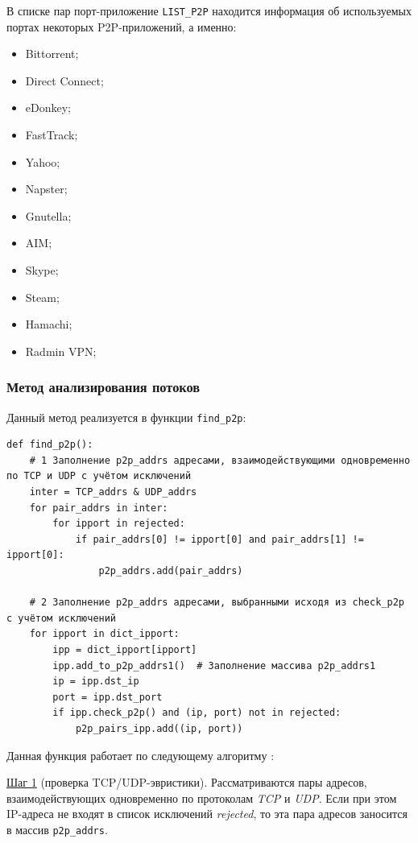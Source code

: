 \documentclass[bachelor, och, coursework]{SCWorks}
\begin{document}
В списке пар порт-приложение \texttt{LIST_P2P} находится информация об используемых портах некоторых P2P-приложений, а именно:

\begin{itemize}
    \item Bittorrent;
    \item Direct Connect;
    \item eDonkey;
    \item FastTrack;
    \item Yahoo;
    \item Napster;
    \item Gnutella;
    \item AIM;
    \item Skype;
    \item Steam;
    \item Hamachi;
    \item Radmin VPN;
\end{itemize}

\subsubsection{Метод анализирования потоков}
Данный метод реализуется в функции \texttt{find_p2p}:

\begin{verbatim}
def find_p2p():
    # 1 Заполнение p2p_addrs адресами, взаимодействующими одновременно по TCP и UDP с учётом исключений
    inter = TCP_addrs & UDP_addrs
    for pair_addrs in inter:
        for ipport in rejected:
            if pair_addrs[0] != ipport[0] and pair_addrs[1] != ipport[0]:
                p2p_addrs.add(pair_addrs)

    # 2 Заполнение p2p_addrs адресами, выбранными исходя из check_p2p с учётом исключений
    for ipport in dict_ipport:
        ipp = dict_ipport[ipport]
        ipp.add_to_p2p_addrs1()  # Заполнение массива p2p_addrs1
        ip = ipp.dst_ip
        port = ipp.dst_port
        if ipp.check_p2p() and (ip, port) not in rejected:
            p2p_pairs_ipp.add((ip, port))
\end{verbatim}

Данная функция работает по следующему алгоритму \cite{algorithm}:

\underline{Шаг 1} (проверка TCP/UDP-эвристики). 
Рассматриваются пары адресов, взаимодействующих одновременно по протоколам \textit{TCP} и \textit{UDP}. 
Если при этом IP-адреса не входят в список исключений \textit{rejected}, то эта пара адресов заносится в массив \texttt{p2p_addrs}.
\end{document}
